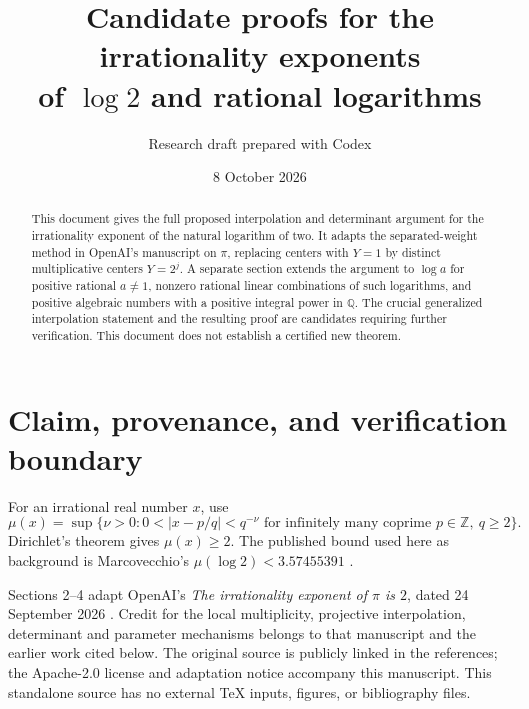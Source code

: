 \documentclass[11pt]{article}
\title{Candidate proofs for the irrationality exponents\\of $\log 2$ and rational logarithms}
\author{Research draft prepared with Codex}
\date{8 October 2026}
\newcommand{\QQ}{\mathbb Q}
\newcommand{\ZZ}{\mathbb Z}
\theoremstyle{definition}
\theoremstyle{remark}
\numberwithin{equation}{section}
\begin{document}
\maketitle
\begin{abstract}
This document gives the full proposed interpolation and determinant
argument for the irrationality exponent of the natural logarithm of two.
It adapts the separated-weight method in OpenAI's manuscript on $\pi$,
replacing centers with $Y=1$ by distinct multiplicative centers $Y=2^j$.
A separate section extends the argument to $\log a$ for positive rational $a\ne1$,
nonzero rational linear combinations of such logarithms, and positive
algebraic numbers with a positive integral power in $\QQ$.
The crucial generalized interpolation statement and the resulting proof
are candidates requiring further verification. This document does not
establish a certified new theorem.
\end{abstract}
\begin{center}
\end{center}
\tableofcontents
\clearpage

\section{Claim, provenance, and verification boundary}
For an irrational real number $x$, use
\[
\mu(x)=\sup\{\nu>0:0<|x-p/q|<q^{-\nu}
\text{ for infinitely many coprime }p\in\ZZ,\ q\ge2\}.
\]
Dirichlet's theorem gives $\mu(x)\ge2$. The published bound used here
as background is Marcovecchio's $\mu(\log2)<3.57455391$
\cite[Theorem 1.1]{marcovecchio}.

Sections 2--4 adapt OpenAI's \emph{The irrationality exponent of $\pi$
is $2$}, dated 24 September 2026 \cite{openai}. Credit for the local
multiplicity, projective interpolation, determinant and parameter
mechanisms belongs to that manuscript and the earlier work cited below.
The original source is publicly linked in the references;
the Apache-2.0 license and adaptation notice accompany this manuscript. This standalone source has no external TeX inputs,
figures, or bibliography files.
\end{document}
